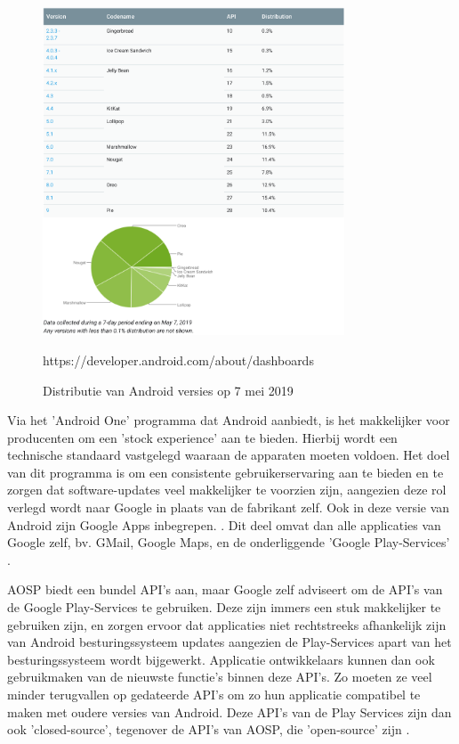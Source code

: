 \begin{figure}
    \centering
    \includegraphics[width=0.8\textwidth]{img/fragmentation.png}
    \caption{Distributie van Android versies op 7 mei 2019}
    \label{fig:androidfragmentation}
    \medskip
    \small
    https://developer.android.com/about/dashboards
\end{figure}

Via het 'Android One' programma dat Android aanbiedt, is het makkelijker voor producenten om een 'stock experience' aan te bieden. Hierbij wordt een technische standaard vastgelegd waaraan de apparaten moeten voldoen. Het doel van dit programma is om een consistente gebruikerservaring aan te bieden en te zorgen dat software-updates veel makkelijker te voorzien zijn, aangezien deze rol verlegd wordt naar Google in plaats van de fabrikant zelf. Ook in deze versie van Android zijn Google Apps inbegrepen. \autocite{android_androidone}.  Dit deel omvat dan alle applicaties van Google zelf, bv. GMail, Google Maps, en de onderliggende 'Google Play-Services' \autocite{amadeo_open-source}.

AOSP biedt een bundel API's  aan, maar Google zelf adviseert om de API's van de Google Play-Services te gebruiken. Deze zijn immers een stuk makkelijker te gebruiken zijn, en zorgen ervoor dat applicaties niet rechtstreeks afhankelijk zijn van Android besturingssysteem updates aangezien de Play-Services apart van het besturingssysteem wordt bijgewerkt. Applicatie ontwikkelaars kunnen dan ook gebruikmaken van de nieuwste functie's binnen deze API's. Zo moeten ze veel minder terugvallen op gedateerde API's om zo hun applicatie compatibel te maken met oudere versies van Android.  Deze API's van de Play Services zijn dan ook 'closed-source', tegenover de API's van AOSP, die 'open-source' zijn \autocite{marshall_google-play-services} . 

